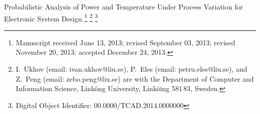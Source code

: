 {\TitleFont Probabilistic Analysis of Power and Temperature Under Process Variation for Electronic System Design}%
\thanks{Manuscript received June 13, 2013; revised September 03, 2013; revised November 20, 2013; accepted December 24, 2013.}
\thanks{I.~Ukhov (email: ivan.ukhov@liu.se), P.~Eles (email: petru.eles@liu.se), and Z.~Peng (email: zebo.peng@liu.se) are with the Department of Computer and Information Science, Link\"{o}ng University, Link\"{o}ing 581\,83, Sweden.}
\thanks{Digital Object Identifier: 00.0000/TCAD.2014.0000000}

